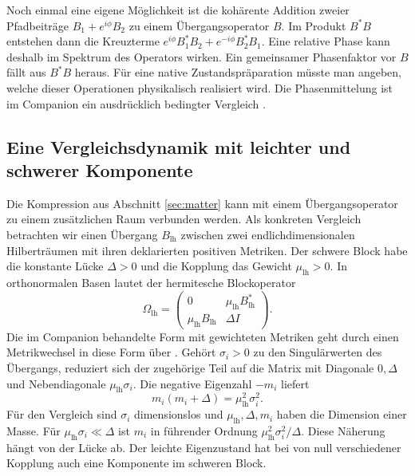 Noch einmal eine eigene Möglichkeit ist die kohärente
Addition zweier Pfadbeiträge \(B_1+e^{i\phi}B_2\) zu
einem Übergangsoperator \(B\). Im Produkt \(B^*B\)
entstehen dann die Kreuzterme
\(e^{i\phi}B_1^*B_2+e^{-i\phi}B_2^*B_1\).
Eine relative Phase kann deshalb im Spektrum des
Operators wirken. Ein gemeinsamer Phasenfaktor vor
\(B\) fällt aus \(B^*B\) heraus. Für eine native
Zustandspräparation müsste man angeben, welche dieser
Operationen physikalisch realisiert wird. Die
Phasenmittelung ist im Companion ein ausdrücklich
bedingter Vergleich \cite{companion,physics}.

\subsection{Eine Vergleichsdynamik mit leichter und schwerer Komponente}

Die Kompression aus Abschnitt \ref{sec:matter} kann mit einem Übergangsoperator zu einem zusätzlichen Raum verbunden werden. Als konkreten Vergleich betrachten wir einen Übergang \(B_{\mathrm{lh}}\) zwischen zwei endlichdimensionalen Hilberträumen mit ihren deklarierten positiven Metriken. Der schwere Block habe die konstante Lücke \(\Delta>0\) und die Kopplung das Gewicht \(\mu_{\mathrm{lh}}>0\). In orthonormalen Basen lautet der hermitesche Blockoperator
\[
 \Omega_{\mathrm{lh}}=
 \begin{pmatrix}
 0 & \mu_{\mathrm{lh}} B_{\mathrm{lh}}^* \\
 \mu_{\mathrm{lh}} B_{\mathrm{lh}} & \Delta I
 \end{pmatrix}.
\]
Die im Companion behandelte Form mit gewichteten Metriken geht durch einen Metrikwechsel in diese Form über \cite{companion,repo}. Gehört \(\sigma_i>0\) zu den Singulärwerten des Übergangs, reduziert sich der zugehörige Teil auf die Matrix mit Diagonale \(0,\Delta\) und Nebendiagonale \(\mu_{\mathrm{lh}}\sigma_i\). Die negative Eigenzahl \(-m_i\) liefert
\begin{equation}
 m_i(m_i+\Delta)=\mu_{\mathrm{lh}}^2\sigma_i^2 .
 \label{eq:gap}
\end{equation}
Für den Vergleich sind \(\sigma_i\) dimensionslos und \(\mu_{\mathrm{lh}},\Delta,m_i\) haben die Dimension einer Masse. Für \(\mu_{\mathrm{lh}}\sigma_i\ll\Delta\) ist \(m_i\) in führender Ordnung \(\mu_{\mathrm{lh}}^2\sigma_i^2/\Delta\). Diese Näherung hängt von der Lücke ab. Der leichte Eigenzustand hat bei von null verschiedener Kopplung auch eine Komponente im schweren Block.

